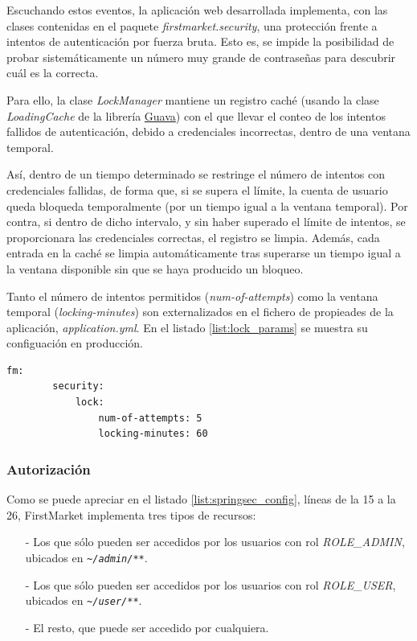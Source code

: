\documentclass[a4paper]{article}
\begin{document}
	Escuchando estos eventos, la aplicación web desarrollada implementa, con las clases contenidas en el paquete \emph{firstmarket.security},  una protección frente a intentos de autenticación por fuerza bruta. Esto es, se impide la posibilidad de probar sistemáticamente un número muy grande de contraseñas para descubrir cuál es la correcta.
	
	Para ello, la clase \emph{LockManager} mantiene un registro caché (usando la clase \emph{LoadingCache} de la librería \href{https://guava.dev/}{Guava}) con el que llevar el conteo de los intentos fallidos de autenticación, debido a credenciales incorrectas, dentro de una ventana temporal.
	
	Así, dentro de un tiempo determinado se restringe el número de intentos con credenciales fallidas, de forma que, si se supera el límite, la cuenta de usuario queda bloqueda temporalmente (por un tiempo igual a la ventana temporal). Por contra, si dentro de dicho intervalo, y sin haber superado el límite de intentos, se proporcionara las credenciales correctas, el registro se limpia. Además, cada entrada en la caché se limpia automáticamente tras superarse un tiempo igual a la ventana disponible sin que se haya producido un bloqueo.
	
	Tanto el número de intentos permitidos (\emph{num-of-attempts}) como la ventana temporal (\emph{locking-minutes}) son externalizados en el fichero de propieades de la aplicación, \emph{application.yml}. En el listado \ref{list:lock_params} se muestra su configuación en producción.
	\\
	
	\begin{lstlisting}[caption=Parámetros para configurar la prevención de autenticación por fuerza bruta,label=list:lock_params]
	fm:
		security:
			lock:
				num-of-attempts: 5
				locking-minutes: 60
	\end{lstlisting}
	

	\subsubsection{Autorización}
	Como se puede apreciar en el listado \ref{list:springsec_config}, líneas de la 15 a la 26, FirstMarket implementa tres tipos de recursos: 
	
	\begin{itemize}
		\item[-] Los que sólo pueden ser accedidos por los usuarios con rol \emph{ROLE\_ADMIN}, ubicados en \emph{\nolinkurl{~/admin/**}}.
		\item[-] Los que sólo pueden ser accedidos por los usuarios con rol \emph{ROLE\_USER}, ubicados en \emph{\nolinkurl{~/user/**}}.
		\item[-] El resto, que puede ser accedido por cualquiera.
	\end{itemize}
\end{document}
